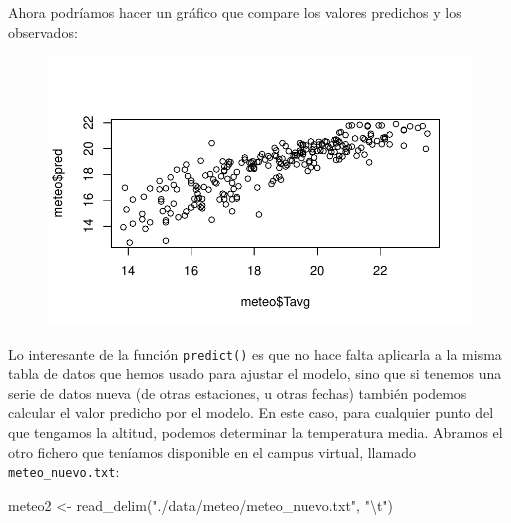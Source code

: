 \documentclass[
  letterpaper,
  DIV=11,
  numbers=noendperiod]{scrreprt}
\newenvironment{Shaded}{\begin{snugshade}}{\end{snugshade}}
\newcommand{\FunctionTok}[1]{\textcolor[rgb]{0.28,0.35,0.67}{#1}}
\newcommand{\NormalTok}[1]{\textcolor[rgb]{0.00,0.23,0.31}{#1}}
\newcommand{\OtherTok}[1]{\textcolor[rgb]{0.00,0.23,0.31}{#1}}
\newcommand{\SpecialCharTok}[1]{\textcolor[rgb]{0.37,0.37,0.37}{#1}}
\newcommand{\StringTok}[1]{\textcolor[rgb]{0.13,0.47,0.30}{#1}}
\begin{document}
Ahora podríamos hacer un gráfico que compare los valores predichos y los
observados:

\begin{Shaded}
\end{Shaded}

\begin{figure}[H]

{\centering \includegraphics{01_RegresionLineal_files/figure-pdf/unnamed-chunk-20-1.pdf}

}

\end{figure}

Lo interesante de la función \texttt{predict()} es que no hace falta
aplicarla a la misma tabla de datos que hemos usado para ajustar el
modelo, sino que si tenemos una serie de datos nueva (de otras
estaciones, u otras fechas) también podemos calcular el valor predicho
por el modelo. En este caso, para cualquier punto del que tengamos la
altitud, podemos determinar la temperatura media. Abramos el otro
fichero que teníamos disponible en el campus virtual, llamado
\texttt{meteo\_nuevo.txt}:

\begin{Shaded}
\begin{Highlighting}[]
\NormalTok{meteo2 }\OtherTok{\textless{}{-}} \FunctionTok{read\_delim}\NormalTok{(}\StringTok{"./data/meteo/meteo\_nuevo.txt"}\NormalTok{, }\StringTok{"}\SpecialCharTok{\textbackslash{}t}\StringTok{"}\NormalTok{)}
\end{Highlighting}
\end{Shaded}
\end{document}
